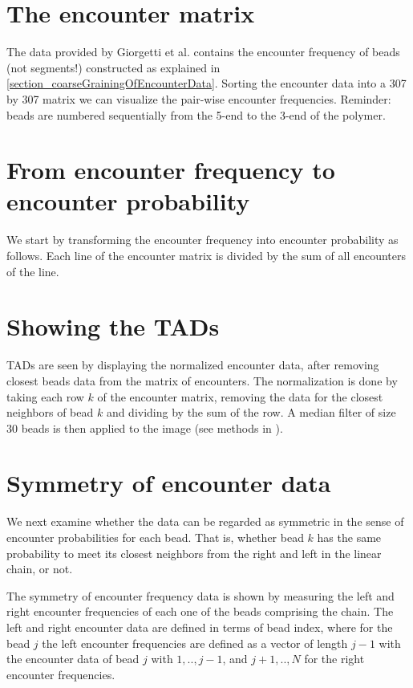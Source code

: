 \documentclass[12pt]{book}
\begin{document}
\section{The encounter matrix}\label{section_theEncounterMatrix}
The data provided by Giorgetti et al.\cite{giorgetti2014predictive} contains the encounter frequency of beads (not segments!) constructed as explained in \ref{section_coarseGrainingOfEncounterData}. Sorting the encounter data into a 307 by 307 matrix we can visualize the pair-wise encounter frequencies. Reminder: beads are numbered sequentially from the 5-end to the 3-end of the polymer.


\section{From encounter frequency to encounter probability} \label{section_fromEncounterFrequencyToEncounterProbability}
We start by transforming the encounter frequency into encounter probability as follows. Each line of the encounter matrix is divided by the sum of all encounters of the line.

\section{Showing the TADs}\label{section_showingTheTADs}
TADs are seen by displaying the normalized encounter data, after removing closest beads data from the matrix of encounters. 
The normalization is done by taking each row $k$ of the encounter matrix, removing the data for the closest neighbors of bead $k$ and dividing by the sum of the row. A median filter of size 30 beads is then applied to the image (see methods in \cite{nora2012spatial}). 
 
\section{Symmetry of encounter data}\label{section_symmetryOfTheEncounterData}
We next examine whether the data can be regarded as symmetric in the sense of encounter probabilities for each bead. That is, whether bead $k$ has the same probability to meet its closest neighbors from the right and left in the linear chain, or not.  

The symmetry of encounter frequency data is shown by measuring the left and right encounter frequencies of each one of the beads comprising the chain.
The left and right encounter data are defined in terms of bead index, where for the bead $j$ the left encounter frequencies are defined as a vector of length $j-1$ with the encounter data of bead $j$ with $1,..,j-1$, and $j+1,..,N$ for the right encounter frequencies. 
\end{document}
